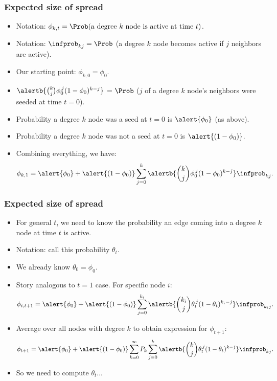 \begin{frame}
  \frametitle{Expected size of spread}

  \begin{itemize}
  \item<1->
    \alert{Notation:}
    $ \phi_{k,t} = 
    \Prob(\mbox{a degree $k$ node is active at time $t$}) $.
  \item<2->
    \alert{Notation:}
    $\infprob_{k j} = \Prob$ (a degree $k$ node becomes active
    if $j$ neighbors are active).
  \item<3-> 
    Our starting point: $ \phi_{k,0} = \phi_0$.
  \item<4->
    $ 
    \alertb{\binom{k}{j}
      \phi_0^{\, j}
      (1-\phi_0)^{k-j} }
    $ 
    =
    $\Prob$ ($j$ of a degree $k$ node's neighbors were seeded at time $t=0$).
  \item<5-> 
    Probability a degree $k$ node was a seed at $t=0$ is $\alert{\phi_0}$ (as above).
  \item<6-> 
    Probability a degree $k$ node was not a seed at $t=0$ is $\alert{(1-\phi_0)}$.
  \item<7-> 
    Combining everything, we have:
    $$ 
    \phi_{k,1}
    = 
    \alert{\phi_{0}}
    + 
    \alert{(1-\phi_{0})}
    \sum_{j=0}^{k}
    \alertb{\binom{k}{j}
    \phi_0^{\, j}
    (1-\phi_0)^{k-j} }
  \infprob_{k j}.
    $$
  \end{itemize}

\end{frame}

\begin{frame}
  \frametitle{Expected size of spread}

  \begin{itemize}
  \item<1->
    For general $t$, we need to know
    the probability an edge coming into a degree $k$ node
    at time $t$ is active.
  \item<2->
    \alert{Notation:} call this probability $\theta_t$.
  \item<3->
    We already know $\theta_0 = \phi_0$.
  \item<4->
    Story analogous to $t=1$ case.  For specific node $i$:
    $$
    \phi_{i,t+1}
    = 
    \alert{\phi_{0}}
    + 
    \alert{(1-\phi_{0})}
    \sum_{j=0}^{k_i}
    \alertb{\binom{k_i}{j}
    \theta_t^{\, j}
    (1-\theta_t)^{k_i-j}}
    \infprob_{k_i j}.
    $$
  \item<5->
    Average over all nodes with degree $k$ to obtain expression for $\phi_{t+1}$:
    $$
    \phi_{t+1}
    = 
    \alert{\phi_{0}}
    + 
    \alert{(1-\phi_{0})}
    \sum_{k=0}^{\infty} P_k 
    \sum_{j=0}^{k}
    \alertb{\binom{k}{j}
    \theta_t^{\, j}
    (1-\theta_t)^{k-j}}
    \infprob_{kj}.
    $$
  \item<6->
    So we need to compute $\theta_t$...  
  \end{itemize}
  
\end{frame}


